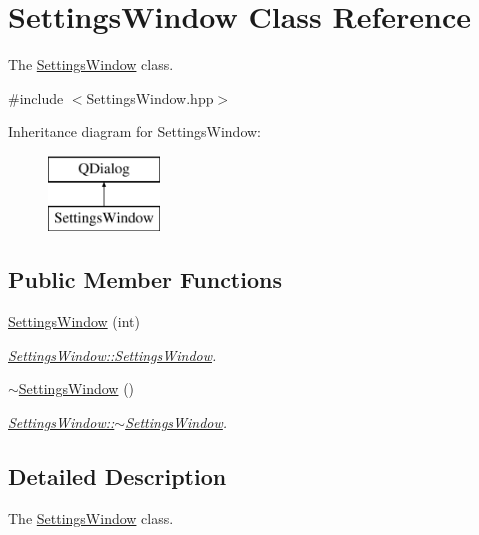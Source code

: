\hypertarget{classSettingsWindow}{\section{Settings\+Window Class Reference}
\label{classSettingsWindow}
}


The \hyperlink{classSettingsWindow}{Settings\+Window} class.  




{\ttfamily \#include $<$Settings\+Window.\+hpp$>$}

Inheritance diagram for Settings\+Window\+:\begin{figure}[H]
\begin{center}
\leavevmode
\includegraphics[height=2.000000cm]{classSettingsWindow}
\end{center}
\end{figure}
\subsection*{Public Member Functions}
\begin{DoxyCompactItemize}
\item 
\hyperlink{classSettingsWindow_aac6f02aa8c1e5022faacdf1c17c101d9}{Settings\+Window} (int)
\begin{DoxyCompactList}\small\item\em \hyperlink{classSettingsWindow_aac6f02aa8c1e5022faacdf1c17c101d9}{Settings\+Window\+::\+Settings\+Window}. \end{DoxyCompactList}\item 
\hyperlink{classSettingsWindow_a380a4a1227c28e0b3499175b10cea230}{$\sim$\+Settings\+Window} ()
\begin{DoxyCompactList}\small\item\em \hyperlink{classSettingsWindow_a380a4a1227c28e0b3499175b10cea230}{Settings\+Window\+::$\sim$\+Settings\+Window}. \end{DoxyCompactList}\end{DoxyCompactItemize}


\subsection{Detailed Description}
The \hyperlink{classSettingsWindow}{Settings\+Window} class. 

